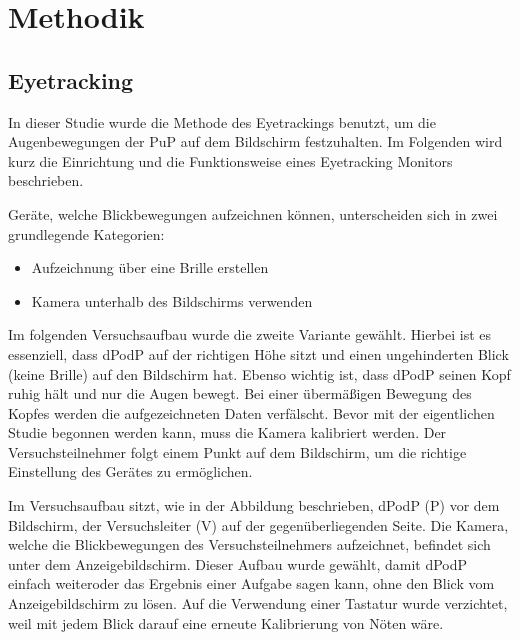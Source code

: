\chapter{Methodik}

\section{Eyetracking}

In dieser Studie wurde die Methode des Eyetrackings benutzt, um die Augenbewegungen der \gls{PuP} auf dem Bildschirm festzuhalten. Im Folgenden wird kurz die Einrichtung und die Funktionsweise eines Eyetracking Monitors beschrieben. 

Geräte, welche Blickbewegungen aufzeichnen können, unterscheiden sich in zwei grundlegende Kategorien:
    \begin{itemize}
        \item Aufzeichnung über eine Brille erstellen
        \item Kamera unterhalb des Bildschirms verwenden
    \end{itemize}


Im folgenden Versuchsaufbau wurde die zweite Variante gewählt. Hierbei ist es essenziell, dass \gls{dPodP} auf der richtigen Höhe sitzt und einen ungehinderten Blick (keine Brille) auf den Bildschirm hat. Ebenso wichtig ist, dass \gls{dPodP} seinen Kopf ruhig hält und nur die Augen bewegt. Bei einer übermäßigen Bewegung des Kopfes werden die aufgezeichneten Daten verfälscht. Bevor mit der eigentlichen Studie begonnen werden kann, muss die Kamera kalibriert werden. Der Versuchsteilnehmer folgt einem Punkt auf dem Bildschirm, um die richtige Einstellung des Gerätes zu ermöglichen. 


Im Versuchsaufbau sitzt, wie in der Abbildung beschrieben, \gls{dPodP} (P) vor dem Bildschirm, der Versuchsleiter (V) auf der gegenüberliegenden Seite.
Die Kamera, welche die Blickbewegungen des Versuchsteilnehmers aufzeichnet, befindet sich unter dem Anzeigebildschirm. Dieser Aufbau wurde gewählt, damit \gls{dPodP} einfach \grqq weiter\grqq oder das Ergebnis einer Aufgabe sagen kann, ohne den Blick vom Anzeigebildschirm zu lösen. Auf die Verwendung einer Tastatur wurde verzichtet, weil mit jedem Blick darauf eine erneute Kalibrierung von Nöten wäre.

